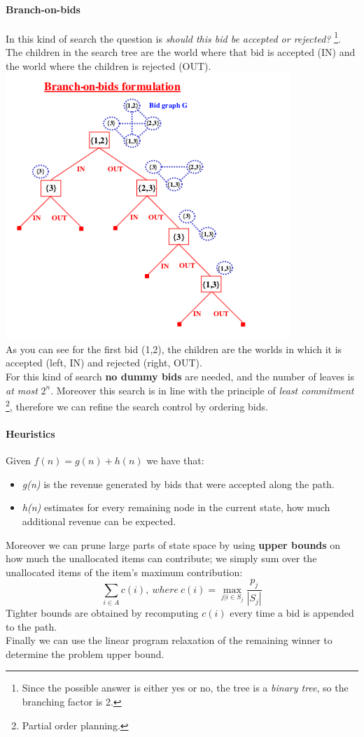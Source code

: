 \documentclass[10pt,a4paper]{article}
\begin{document}
\paragraph{Branch-on-bids}
In this kind of search the question is \textit{should this bid be accepted or rejected?} \footnote{Since the possible answer is either yes or no, the tree is a \textit{binary tree}, so the branching factor is 2.}. The children in the search tree are the world where that bid is accepted (IN) and the world where the children is rejected (OUT).\\

\includegraphics[scale=0.8]{images/branch_on_bid.png}\\

As you can see for the first bid (1,2), the children are the worlds in which it is accepted (left, IN) and rejected (right, OUT).\\
For this kind of search \textbf{no dummy bids} are needed, and the number of leaves is \textit{at most} $2^n$. Moreover this search is in line with the principle of \textit{least commitment} \footnote{Partial order planning.}, therefore we can refine the search control by ordering bids.


\paragraph{Heuristics}
Given $f(n)=g(n)+h(n)$ we have that:
\begin{itemize}
\item \textit{g(n)} is the revenue generated by bids that were accepted along the path.
\item \textit{h(n)} estimates for every remaining node in the current state, how much additional revenue can be expected.
\end{itemize}
Moreover we can prune large parts of state space by using \textbf{upper bounds} on how much the unallocated items can contribute; we simply sum over the unallocated items of the item's maximum contribution:
\[\sum_{i \in A}c(i),\ where\ c(i)=\max_{j|i\in S_j}\frac{p_j}{|S_j|}\]
Tighter bounds are obtained by recomputing $c(i)$ every time a bid is appended to the path.\\
Finally we can use the linear program relaxation of the remaining winner to determine the problem upper bound.
\end{document}
